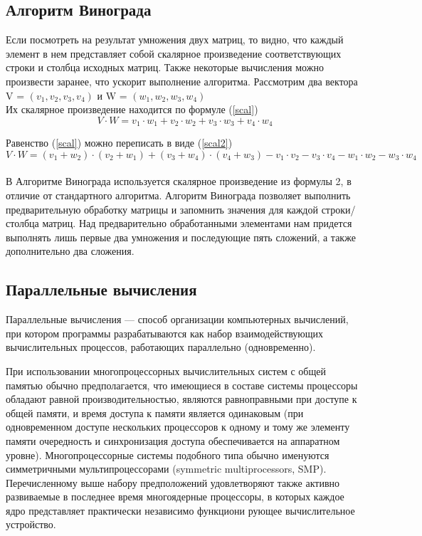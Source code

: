 \documentclass[a4paper, 14pt]{article}
\begin{document}
		\subsection{Алгоритм Винограда}
		
		Если посмотреть на результат умножения двух матриц, то видно,
		что каждый элемент в нем представляет собой скалярное произведение
		соответствующих строки и столбца исходных матриц. Также некоторые вычисления можно произвести заранее, что ускорит выполнение алгоритма.
		Рассмотрим два вектора V = $(v_{1}, v_{2}, v_{3}, v_{4})$ и W = $(w_{1}, w_{2}, w_{3}, w_{4})$\\
		    Их скалярное произведение находится по формуле (\ref{scal})\\
		    \begin{equation}\label{scal}
 V \cdot W=v_1 \cdot w_1 + v_2 \cdot w_2 + v_3 \cdot w_3 + v_4 \cdot w_4 
		    \end{equation}
		    
		    
         Равенство (\ref{scal}) можно переписать в виде (\ref{scal2})\\
         \begin{equation}\label{scal2}
V \cdot W=(v_1 + w_2) \cdot (v_2 + w_1) + (v_3 + w_4) \cdot (v_4 + w_3) - v_1 \cdot v_2 - v_3 \cdot v_4 - w_1 \cdot w_2 - w_3 \cdot w_4
         \end{equation}\\
        В Алгоритме Винограда используется скалярное произведение из формулы 2, в отличие от стандартного алгоритма. Алгоритм Винограда позволяет выполнить предварительную обработку матрицы и запомнить значения для каждой строки/столбца матриц.
Над предварительно обработанными элементами нам придется выполнять лишь первые два умножения и последующие пять сложений, а также
дополнительно два сложения\cite{litlink1}.\\
		
		\subsection{Параллельные вычисления}
		Параллельные вычисления — способ организации компьютерных вычислений, при котором программы разрабатываются как набор взаимодействующих вычислительных процессов, работающих параллельно (одновременно). 
		
		При использовании многопроцессорных вычислительных систем с общей памятью обычно предполагается, что имеющиеся в составе системы процессоры обладают равной производительностью, являются равноправными при доступе к общей памяти, и время доступа к памяти является одинаковым (при одновременном доступе нескольких процессоров к одному и тому же элементу памяти очередность и синхронизация доступа обеспечивается на аппаратном уровне). Многопроцессорные системы подобного типа обычно именуются симметричными мультипроцессорами (symmetric multiprocessors, SMP).\\		
	Перечисленному выше набору предположений удовлетворяют также активно развиваемые в последнее время многоядерные процессоры, в которых каждое ядро представляет практически независимо функциони рующее вычислительное устройство.
	
\end{document}
